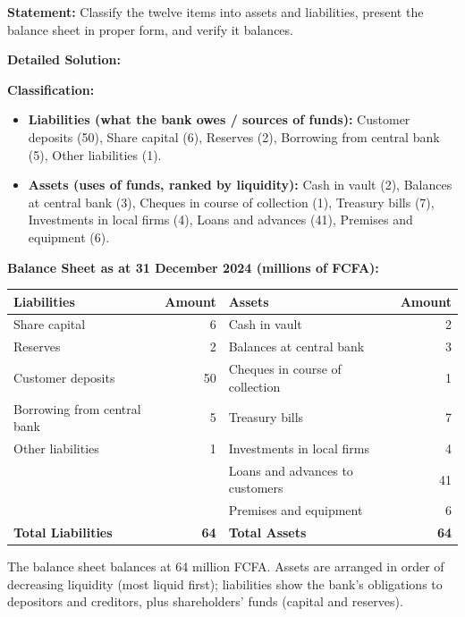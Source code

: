 \documentclass[11pt]{article}
\begin{document}
\begin{exoresolu}
\textbf{Statement:} Classify the twelve items into assets and liabilities, present the balance sheet in proper form, and verify it balances.

\tcblower
\textbf{Detailed Solution:}

\textbf{Classification:}
\begin{itemize}
\item \textbf{Liabilities (what the bank owes / sources of funds):} Customer deposits (50), Share capital (6), Reserves (2), Borrowing from central bank (5), Other liabilities (1).
\item \textbf{Assets (uses of funds, ranked by liquidity):} Cash in vault (2), Balances at central bank (3), Cheques in course of collection (1), Treasury bills (7), Investments in local firms (4), Loans and advances (41), Premises and equipment (6).
\end{itemize}

\textbf{Balance Sheet as at 31 December 2024 (millions of FCFA):}

\begin{center}
\begin{tabularx}{\linewidth}{|X|r|X|r|}
\hline
\rowcolor{popblueL} \textbf{Liabilities} & \textbf{Amount} & \textbf{Assets} & \textbf{Amount} \\
\hline
Share capital & 6 & Cash in vault & 2 \\
\hline
Reserves & 2 & Balances at central bank & 3 \\
\hline
Customer deposits & 50 & Cheques in course of collection & 1 \\
\hline
Borrowing from central bank & 5 & Treasury bills & 7 \\
\hline
Other liabilities & 1 & Investments in local firms & 4 \\
\hline
 &  & Loans and advances to customers & 41 \\
\hline
 &  & Premises and equipment & 6 \\
\hline
\textbf{Total Liabilities} & \textbf{64} & \textbf{Total Assets} & \textbf{64} \\
\hline
\end{tabularx}
\end{center}

The balance sheet balances at 64 million FCFA. Assets are arranged in order of decreasing liquidity (most liquid first); liabilities show the bank's obligations to depositors and creditors, plus shareholders' funds (capital and reserves).


\end{exoresolu}
\end{document}
